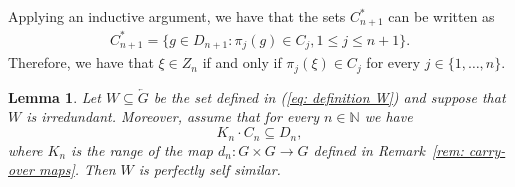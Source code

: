 \documentclass[titlepage,reqno,10pt]{amsart}
\newtheorem{lemma}[theorem]{Lemma}
\theoremstyle{definition}
\newcommand{\tm}{\subseteq}
\begin{document}
Applying an inductive argument, we have that the sets $C_{n+1}^*$ can be written as 
\begin{align*}
    C_{n+1}^*=\{g\in D_{n+1} : \pi_j(g)\in C_j, 1\leq j \leq n+1\}.
\end{align*}
Therefore, we have that $\xi\in Z_n$ if and only if $\pi_j(\xi)\in C_j$ for every $j\in \{1,\ldots, n\}$.
\begin{lemma}\label{perfectly-self-similar}
    Let $W\subseteq \overleftarrow{G}$ be the set defined in (\ref{eq: definition W}) and suppose that $W$ is irredundant. Moreover, assume that for every $n\in\mathbb{N}$ we have
\begin{equation} \label{eq: C_n is in the inside of D_n}
 K_n\cdot C_n \tm D_n,
\end{equation}
where $K_n$ is the range of the map $d_n:G\times G \to G$ defined in Remark~\ref{rem: carry-over maps}. Then $W$ is perfectly self similar.
\end{lemma}
\end{document}
